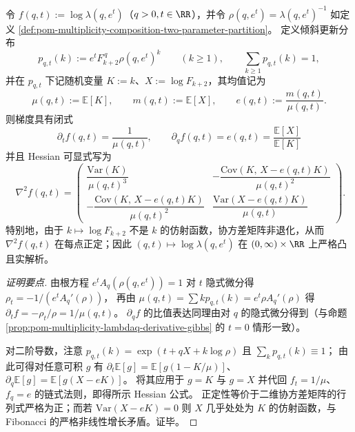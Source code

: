 \begin{proposition}\label{prop:pom-multiplicity-composition-two-parameter-hessian-pd}
令 \(f(q,t):=\log\lambda(q,e^t)\)（\(q>0,t\in\RR\)），并令 \(\rho(q,e^t)=\lambda(q,e^t)^{-1}\) 如定义 \ref{def:pom-multiplicity-composition-two-parameter-partition}。
定义倾斜更新分布
\[
p_{q,t}(k):=e^t F_{k+2}^{\,q}\rho(q,e^t)^{k}\qquad(k\ge 1),
\qquad \sum_{k\ge 1}p_{q,t}(k)=1,
\]
并在 \(p_{q,t}\) 下记随机变量 \(K:=k\)、\(X:=\log F_{k+2}\)，其均值记为
\[
\mu(q,t):=\mathbb{E}[K],\qquad m(q,t):=\mathbb{E}[X],\qquad e(q,t):=\frac{m(q,t)}{\mu(q,t)}.
\]
则梯度具有闭式
\[
\boxed{\;
\partial_t f(q,t)=\frac{1}{\mu(q,t)},\qquad
\partial_q f(q,t)=e(q,t)=\frac{\mathbb{E}[X]}{\mathbb{E}[K]}\;}
\]
并且 Hessian 可显式写为
\[
\boxed{\;
\nabla^2 f(q,t)=
\begin{pmatrix}
\dfrac{\mathrm{Var}(K)}{\mu(q,t)^3} & -\dfrac{\mathrm{Cov}(K,\,X-e(q,t)K)}{\mu(q,t)^2}\\[1.2ex]
-\dfrac{\mathrm{Cov}(K,\,X-e(q,t)K)}{\mu(q,t)^2} & \dfrac{\mathrm{Var}(X-e(q,t)K)}{\mu(q,t)}
\end{pmatrix}.}
\]
特别地，由于 \(k\mapsto \log F_{k+2}\) 不是 \(k\) 的仿射函数，协方差矩阵非退化，从而 \(\nabla^2 f(q,t)\) 在每点正定；因此 \((q,t)\mapsto \log\lambda(q,e^t)\) 在 \((0,\infty)\times\RR\) 上严格凸且实解析。
\end{proposition}
\begin{proof}[证明要点]
由根方程 \(e^tA_q(\rho(q,e^t))=1\) 对 \(t\) 隐式微分得
\(
\rho_t=-1/(e^tA_q'(\rho))
\)，
再由 \(\mu(q,t)=\sum k p_{q,t}(k)=e^t\rho A_q'(\rho)\) 得 \(\partial_t f=-\rho_t/\rho=1/\mu(q,t)\)。
\(\partial_q f\) 的比值表达同理由对 \(q\) 的隐式微分得到（与命题 \ref{prop:pom-multiplicity-lambdaq-derivative-gibbs} 的 \(t=0\) 情形一致）。
\par
对二阶导数，注意 \(p_{q,t}(k)=\exp(t+qX+k\log\rho)\) 且 \(\sum_k p_{q,t}(k)\equiv 1\)；
由此可得对任意可积 \(g\) 有 \(\partial_t\mathbb{E}[g]=\mathbb{E}[g(1-K/\mu)]\)、\(\partial_q\mathbb{E}[g]=\mathbb{E}[g(X-eK)]\)。
将其应用于 \(g=K\) 与 \(g=X\) 并代回 \(f_t=1/\mu\)、\(f_q=e\) 的链式法则，即得所示 Hessian 公式。
正定性等价于二维协方差矩阵的行列式严格为正；而若 \(\mathrm{Var}(X-eK)=0\) 则 \(X\) 几乎处处为 \(K\) 的仿射函数，与 Fibonacci 的严格非线性增长矛盾。证毕。
\end{proof}

